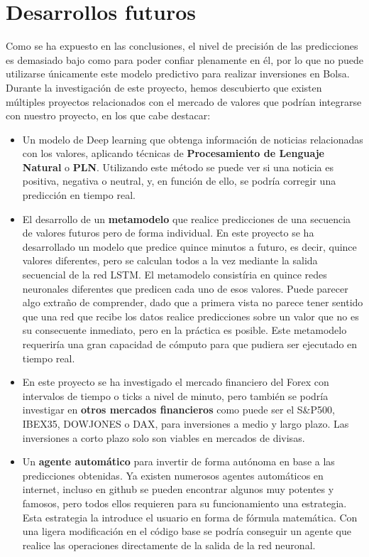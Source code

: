 \chapter{Desarrollos futuros}\label{conclusiones}

Como se ha expuesto en las conclusiones, el nivel de precisión de las predicciones es demasiado bajo como para poder confiar plenamente en él, por lo que no puede utilizarse únicamente este modelo predictivo para realizar inversiones en Bolsa. Durante la investigación de este proyecto, hemos descubierto que existen múltiples proyectos relacionados con el mercado de valores que podrían integrarse con nuestro proyecto, en los que cabe destacar:

\begin{itemize}

\item Un modelo de Deep learning que obtenga información de noticias relacionadas con los valores, aplicando técnicas de \textbf{Procesamiento de Lenguaje Natural} o \textbf{PLN}. Utilizando este método se puede ver si una noticia es positiva, negativa o neutral, y, en función de ello, se podría corregir una predicción en tiempo real.

\item El desarrollo de un \textbf{metamodelo} que realice predicciones de una secuencia de valores futuros pero de forma individual. En este proyecto se ha desarrollado un modelo que predice quince minutos a futuro, es decir, quince valores diferentes, pero se calculan todos a la vez mediante la salida secuencial de la red LSTM. El metamodelo consistíria en quince redes neuronales diferentes que predicen cada uno de esos valores. Puede parecer algo extraño de comprender, dado que a primera vista no parece tener sentido que una red que recibe los datos realice predicciones sobre un valor que no es su consecuente inmediato, pero en la práctica es posible. Este metamodelo requeriría una gran capacidad de cómputo para que pudiera ser ejecutado en tiempo real.

\item En este proyecto se ha investigado el mercado financiero del Forex con intervalos de tiempo o ticks a nivel de minuto, pero también se podría investigar en \textbf{otros mercados financieros} como puede ser el S\&P500, IBEX35, DOWJONES o DAX, para inversiones a medio y largo plazo. Las inversiones a corto plazo solo son viables en mercados de divisas. 


\item Un \textbf{agente automático} para invertir de forma autónoma en base a las predicciones obtenidas. Ya existen numerosos agentes automáticos en internet, incluso en github se pueden encontrar algunos muy potentes y famosos, pero todos ellos requieren para su funcionamiento una estrategia. Esta estrategia la introduce el usuario en forma de fórmula matemática. Con una ligera modificación en el código base se podría conseguir un agente que realice las operaciones directamente de la salida de la red neuronal.

\end{itemize}

